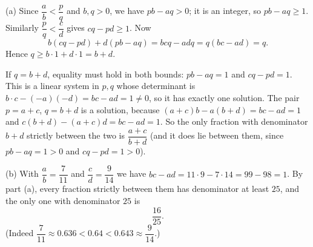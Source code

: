 (a) Since $\dfrac{a}{b}<\dfrac{p}{q}$ and $b,q>0$, we have $pb-aq>0$; it is an integer, so $pb-aq\ge1$. Similarly $\dfrac{p}{q}<\dfrac{c}{d}$ gives $cq-pd\ge1$. Now
\[
b(cq-pd)+d(pb-aq)=bcq-adq=q(bc-ad)=q.
\]
Hence $q\ge b\cdot1+d\cdot1=b+d$.

If $q=b+d$, equality must hold in both bounds: $pb-aq=1$ and $cq-pd=1$. This is a linear system in $p,q$ whose determinant is $b\cdot c-(-a)(-d)=bc-ad=1\ne0$, so it has exactly one solution. The pair $p=a+c$, $q=b+d$ is a solution, because $(a+c)b-a(b+d)=bc-ad=1$ and $c(b+d)-(a+c)d=bc-ad=1$. So the only fraction with denominator $b+d$ strictly between the two is $\dfrac{a+c}{b+d}$ (and it does lie between them, since $pb-aq=1>0$ and $cq-pd=1>0$).

(b) With $\dfrac{a}{b}=\dfrac{7}{11}$ and $\dfrac{c}{d}=\dfrac{9}{14}$ we have $bc-ad=11\cdot9-7\cdot14=99-98=1$. By part (a), every fraction strictly between them has denominator at least $25$, and the only one with denominator $25$ is
\[\boxed{\dfrac{16}{25}}.\]
(Indeed $\dfrac{7}{11}\approx0.636<0.64<0.643\approx\dfrac{9}{14}$.)
